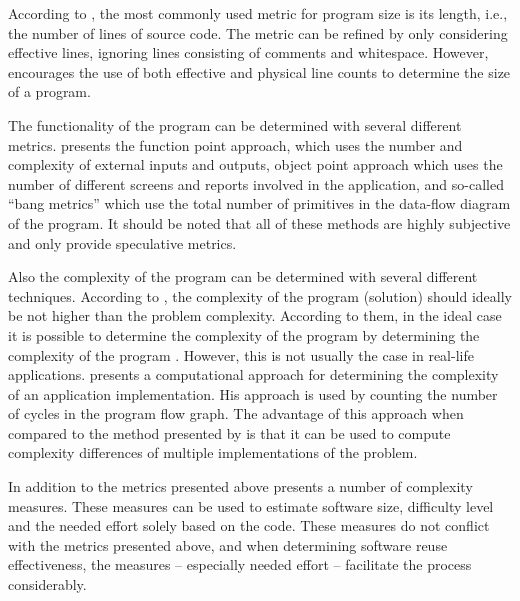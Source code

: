 According to \citet{fenton_software_1998}, the most commonly used metric for program size is its length, i.e., the number of lines of source code. The metric can be refined by only considering effective lines, ignoring lines consisting of comments and whitespace. However, \citet{fenton_software_1998} encourages the use of both effective and physical line counts to determine the size of a program.

The functionality of the program can be determined with several different metrics. \citet{fenton_software_1998} presents the function point approach, which uses the number and complexity of external inputs and outputs, object point approach which uses the number of different screens and reports involved in the application, and so-called ``bang metrics'' which use the total number of primitives in the data-flow diagram of the program. It should be noted that all of these methods are highly subjective and only provide speculative metrics.

Also the complexity of the program can be determined with several different techniques. According to \citet{fenton_software_1998}, the complexity of the program (solution) should ideally be not higher than the problem complexity. According to them, in the ideal case it is possible to determine the complexity of the program by determining the complexity of the program . However, this is not usually the case in real-life applications. \citet{mccabe_complexity_1976} presents a computational approach for determining the complexity of an application implementation. His approach is used by counting the number of cycles in the program flow graph. The advantage of this approach when compared to the method presented by \citet{fenton_software_1998} is that it can be used to compute complexity differences of multiple implementations of the problem.

In addition to the metrics presented above \citet{halstead_elements_1977} presents a number of complexity measures. These measures can be used to estimate software size, difficulty level and the needed effort solely based on the code. These measures do not conflict with the metrics presented above, and when determining software reuse effectiveness, the measures -- especially needed effort -- facilitate the process considerably. 


